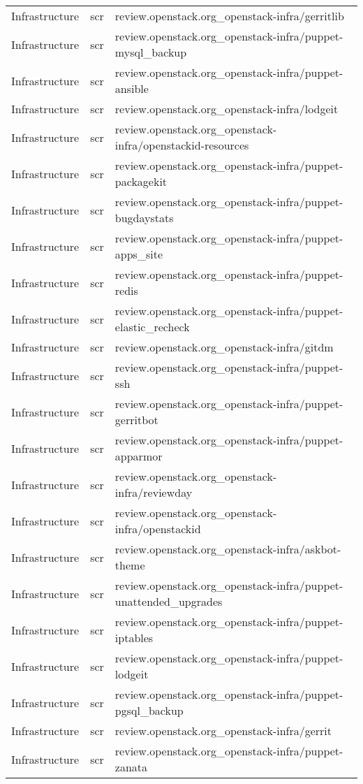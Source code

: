 \begin{center}
\begin{longtable}{|p{4cm}|p{1cm}|p{10cm}|}
Infrastructure&scr&review.openstack.org\_openstack-infra/gerritlib\\ 
Infrastructure&scr&review.openstack.org\_openstack-infra/puppet-mysql\_backup\\ 
Infrastructure&scr&review.openstack.org\_openstack-infra/puppet-ansible\\ 
Infrastructure&scr&review.openstack.org\_openstack-infra/lodgeit\\ 
Infrastructure&scr&review.openstack.org\_openstack-infra/openstackid-resources\\ 
Infrastructure&scr&review.openstack.org\_openstack-infra/puppet-packagekit\\ 
Infrastructure&scr&review.openstack.org\_openstack-infra/puppet-bugdaystats\\ 
Infrastructure&scr&review.openstack.org\_openstack-infra/puppet-apps\_site\\ 
Infrastructure&scr&review.openstack.org\_openstack-infra/puppet-redis\\ 
Infrastructure&scr&review.openstack.org\_openstack-infra/puppet-elastic\_recheck\\ 
Infrastructure&scr&review.openstack.org\_openstack-infra/gitdm\\ 
Infrastructure&scr&review.openstack.org\_openstack-infra/puppet-ssh\\ 
Infrastructure&scr&review.openstack.org\_openstack-infra/puppet-gerritbot\\ 
Infrastructure&scr&review.openstack.org\_openstack-infra/puppet-apparmor\\ 
Infrastructure&scr&review.openstack.org\_openstack-infra/reviewday\\ 
Infrastructure&scr&review.openstack.org\_openstack-infra/openstackid\\ 
Infrastructure&scr&review.openstack.org\_openstack-infra/askbot-theme\\ 
Infrastructure&scr&review.openstack.org\_openstack-infra/puppet-unattended\_upgrades\\ 
Infrastructure&scr&review.openstack.org\_openstack-infra/puppet-iptables\\ 
Infrastructure&scr&review.openstack.org\_openstack-infra/puppet-lodgeit\\ 
Infrastructure&scr&review.openstack.org\_openstack-infra/puppet-pgsql\_backup\\ 
Infrastructure&scr&review.openstack.org\_openstack-infra/gerrit\\ 
Infrastructure&scr&review.openstack.org\_openstack-infra/puppet-zanata\\ 

\end{longtable}
\end{center}
